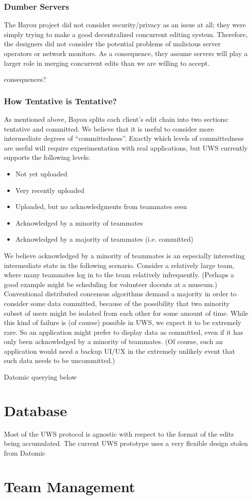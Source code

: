 \documentclass{article}
\begin{document}
\subsubsection{Dumber Servers}

The Bayou project did not consider security/privacy as an issue at all; they were simply trying to make a good decentralized concurrent editing system.
Therefore, the designers did not consider the potential problems of malicious server operators or network monitors.
As a consequence, they assume servers will play a larger role in merging concurrent edits than we are willing to accept.

consequences?

\subsubsection{How Tentative is Tentative?}

As mentioned above, Bayou splits each client's edit chain into two sections: tentative and committed.
We believe that it is useful to consider more intermediate degrees of ``committedness''.
Exactly which levels of committedness are useful will require experimentation with real applications, but UWS currently supports the following levels:

\begin{itemize}
\item Not yet uploaded
\item Very recently uploaded
\item Uploaded, but no acknowledgments from teammates seen
\item Acknowledged by a minority of teammates
\item Acknowledged by a majority of teammates (i.e. committed)
\end{itemize}

We believe acknowledged by a minority of teammates is an especially interesting intermediate state in the following scenario.
Consider a relatively large team, where many teammates log in to the team relatively infrequently.
(Perhaps a good example might be scheduling for volunteer docents at a museum.)
Conventional distributed concensus algorithms demand a majority in order to consider some data committed, because of the possibility that two minority subset of users might be isolated from each other for some amount of time.
While this kind of failure is (of course) possible in UWS, we expect it to be extremely rare.
So an application might prefer to display data as committed, even if it has only been acknowledged by a minority of teammates.
(Of course, such an application would need a backup UI/UX in the extremely unlikely event that such data needs to be uncommitted.)

Datomic querying below

\section{Database}

Most of the UWS protocol is agnostic with respect to the format of the edits being accumulated.
The current UWS prototype uses a very flexible design stolen from Datomic

\section{Team Management}
\end{document}
